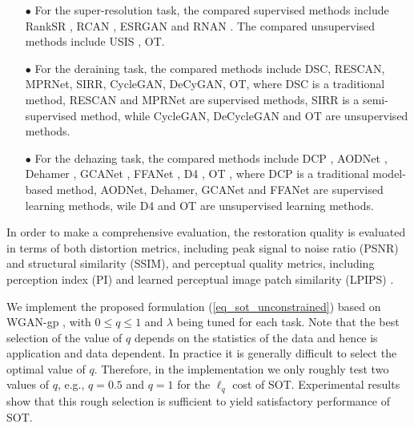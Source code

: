 \documentclass[10pt,journal,compsoc]{IEEEtran}
\begin{document}
\begin{itemize}
\item[$\bullet$]
For the super-resolution task, the compared supervised methods 
include RankSR \cite{ranksrgan}, RCAN \cite{rcan}, 
ESRGAN \cite{wang2018esrgan} and RNAN \cite{rnan}. 
The compared unsupervised methods include USIS \cite{usis}, 
OT\cite{wang2022optimal}.%
\vspace{3pt}\item[$\bullet$]
For the deraining task, the compared methods 
include DSC\cite{dsc}, RESCAN\cite{rescan}, 
MPRNet\cite{multi}, SIRR\cite{wei2019semi}, 
CycleGAN\cite{cyclegan}, DeCyGAN\cite{ deraincyclegan}, 
OT\cite{wang2022optimal}, where DSC is a traditional method, 
RESCAN and MPRNet are supervised methods, SIRR is a semi-supervised method, 
while CycleGAN, DeCycleGAN and OT are unsupervised methods.
\vspace{3pt}\item[$\bullet$]
For the dehazing task, the compared methods include DCP \cite{he2010single}, 
AODNet \cite{aodnet}, Dehamer \cite{dehamer}, GCANet \cite{gcanet}, 
FFANet \cite{ffanet}, D4 \cite{ d4}, OT \cite{wang2022optimal}, 
where DCP is a traditional model-based method, 
AODNet, Dehamer, GCANet and FFANet are supervised learning methods, 
wile D4 and OT are unsupervised learning methods. 
\end{itemize}

In order to make a comprehensive evaluation, the restoration quality
is evaluated in terms of both distortion metrics, 
including peak signal to  noise  ratio  (PSNR) and structural similarity (SSIM),
and perceptual quality metrics, including perception index (PI) \cite{pi} and 
learned perceptual image patch similarity (LPIPS) \cite{lpips}.

We implement the proposed formulation (\ref{eq_sot_unconstrained}) based on 
WGAN-gp \cite{wgangp}, with $0 \leq q \leq 1$ and $\lambda $ being tuned for 
each task. Note that the best selection of the value of $q$ depends on 
the statistics of the data and hence is application and data dependent.
In practice it is generally difficult to select the optimal value of $q$.
Therefore, in the implementation we only roughly test two values of $q$, 
e.g., $q=0.5$ and $q=1$ for the $\ell_q$ cost of SOT.
Experimental results show that this rough selection is 
sufficient to yield satisfactory performance of SOT.
\end{document}
